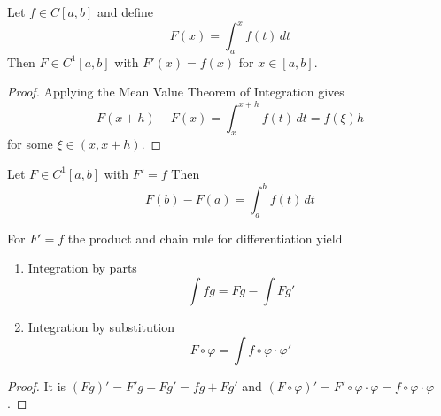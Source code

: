 \begin{theorem}\label{thm:differentiation}
    Let \( f \in C[a,b] \) and define
    \[
        F(x) = \int_a^x f(t)\,dt
    \]
    Then \( F \in C^1[a,b] \) with \( F'(x) = f(x) \) for \( x \in [a,b] \).
\end{theorem}

\begin{proof}
    Applying the Mean Value Theorem of Integration gives
    \[
        F(x + h) - F(x) =  \int_x^{x + h} f(t)\,dt = f(\xi) h
    \]
    for some \( \xi \in (x, x + h) \).
\end{proof}
\bigskip

\begin{theorem}\label{thm:fund_calculus}
    Let \( F \in C^1[a,b] \) with \( F' = f \)  Then
    \[
        F(b) -F(a) = \int_a^b f(t)\,dt
    \]
\end{theorem}
\bigskip


\begin{lemma}
    For \( F' = f \) the product and chain rule for differentiation yield
    \begin{enumerate}
        \item Integration by parts
              \[
                  \int fg = Fg - \int Fg'
              \]
        \item Integration by substitution
              \[
                  F \circ \varphi = \int f\circ \varphi \cdot\varphi'
              \]
    \end{enumerate}
\end{lemma}
\begin{proof}
    It is \( (Fg)' = F'g + Fg' = fg + Fg' \) and
    \( (F\circ \varphi)' = F'\circ \varphi \cdot\varphi = f\circ \varphi \cdot\varphi \).
\end{proof}
\bigskip


